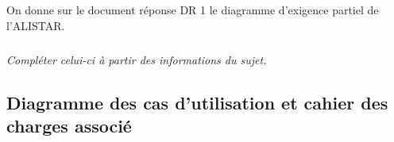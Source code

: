 \documentclass[11pt,oneside]{article}
\begin{document}
On donne sur le document réponse DR 1 le diagramme d'exigence partiel de l’ALISTAR.

\subparagraph{}
\textit{Compléter celui-ci à partir des informations du sujet.}


\subsection{Diagramme des cas d'utilisation et cahier des charges associé}
\end{document}
